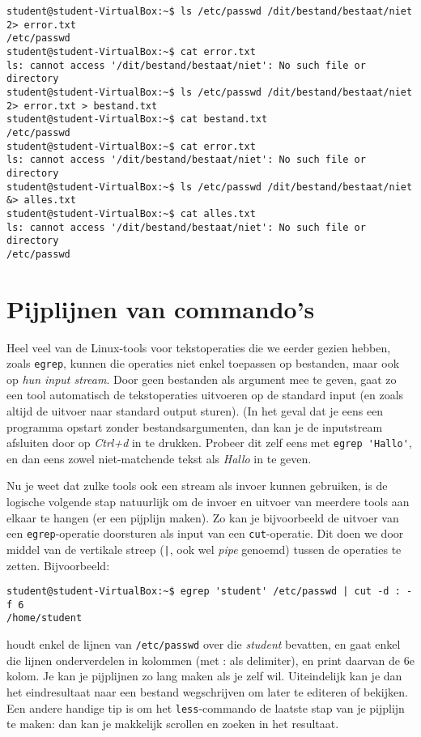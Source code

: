 \documentclass[a4paper,twoside,openany]{memoir}
\begin{document}
\begin{verbatim}
student@student-VirtualBox:~$ ls /etc/passwd /dit/bestand/bestaat/niet 2> error.txt
/etc/passwd
student@student-VirtualBox:~$ cat error.txt
ls: cannot access '/dit/bestand/bestaat/niet': No such file or directory
student@student-VirtualBox:~$ ls /etc/passwd /dit/bestand/bestaat/niet 2> error.txt > bestand.txt
student@student-VirtualBox:~$ cat bestand.txt
/etc/passwd
student@student-VirtualBox:~$ cat error.txt
ls: cannot access '/dit/bestand/bestaat/niet': No such file or directory
student@student-VirtualBox:~$ ls /etc/passwd /dit/bestand/bestaat/niet &> alles.txt
student@student-VirtualBox:~$ cat alles.txt
ls: cannot access '/dit/bestand/bestaat/niet': No such file or directory
/etc/passwd
\end{verbatim}

\chapter{Pijplijnen van commando's}
Heel veel van de Linux-tools voor tekstoperaties die we eerder gezien hebben, zoals \verb!egrep!, kunnen die operaties niet enkel toepassen op bestanden, maar ook op \emph{hun input stream}. Door geen bestanden als argument mee te geven, gaat zo een tool automatisch de tekstoperaties uitvoeren op de standard input (en zoals altijd de uitvoer naar standard output sturen). (In het geval dat je eens een programma opstart zonder bestandsargumenten, dan kan je de inputstream afsluiten door op \emph{Ctrl+d} in te drukken. Probeer dit zelf eens met \verb!egrep 'Hallo'!, en dan eens zowel niet-matchende tekst als \emph{Hallo} in te geven.

Nu je weet dat zulke tools ook een stream als invoer kunnen gebruiken, is de logische volgende stap natuurlijk om de invoer en uitvoer van meerdere tools aan elkaar te hangen (er een pijplijn maken). Zo kan je bijvoorbeeld de uitvoer van een \verb!egrep!-operatie doorsturen als input van een \verb!cut!-operatie. Dit doen we door middel van de vertikale streep (\verb!|!, ook wel \emph{pipe} genoemd) tussen de operaties te zetten. Bijvoorbeeld:
\begin{verbatim}
student@student-VirtualBox:~$ egrep 'student' /etc/passwd | cut -d : -f 6
/home/student
\end{verbatim}

houdt enkel de lijnen van \verb!/etc/passwd! over die \emph{student} bevatten, en gaat enkel die lijnen onderverdelen in kolommen (met : als delimiter), en print daarvan de 6e kolom. Je kan je pijplijnen zo lang maken als je zelf wil. Uiteindelijk kan je dan het eindresultaat naar een bestand wegschrijven om later te editeren of bekijken. Een andere handige tip is om het \verb!less!-commando de laatste stap van je pijplijn te maken: dan kan je makkelijk scrollen en zoeken in het resultaat.
\end{document}
